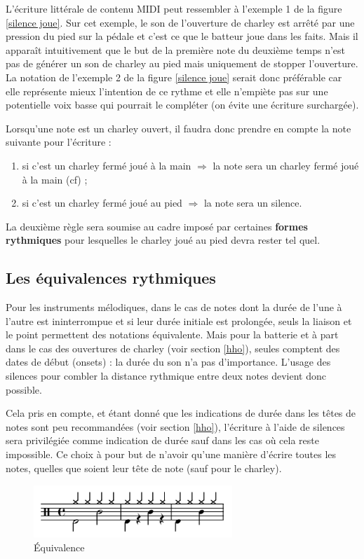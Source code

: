 L’écriture littérale de contenu MIDI peut ressembler à l’exemple 1 de la figure
\ref{silence joue}. Sur cet exemple, le son de l’ouverture de charley est
arrêté par une pression du pied sur la pédale et c’est ce que le batteur joue
dans les faits. Mais il apparaît intuitivement que le but de la première note
du deuxième temps n’est pas de générer un son de charley au pied mais
uniquement de stopper l’ouverture. La notation de l’exemple 2 de la figure
\ref{silence joue} serait donc préférable car elle représente mieux l’intention
de ce rythme et elle n’empiète pas sur une potentielle voix basse qui pourrait
le compléter (on évite une écriture surchargée).

Lorsqu’une note est un charley ouvert, il faudra donc prendre en compte la note
suivante pour l’écriture :
\begin{enumerate}
    \item si c’est un charley fermé joué à la main $\Rightarrow$ la note sera
        un charley fermé joué à la main (cf) ;
    \item si c’est un charley fermé joué au pied $\Rightarrow$ la note sera un
        silence.
\end{enumerate}
La deuxième règle sera soumise au cadre imposé par certaines
\textbf{formes rythmiques} pour lesquelles le charley joué au pied devra rester
tel quel. 

\subsection*{Les équivalences rythmiques}
Pour les instruments mélodiques, dans le cas de notes dont la durée de l’une à
l’autre est ininterrompue et si leur durée initiale est prolongée, seuls la
liaison et le point permettent des notations équivalente. Mais pour la
batterie et à part dans le cas des ouvertures de charley (voir section
\ref{hho}), seules comptent des dates de début (onsets) : la durée du son n’a
pas d’importance. L’usage des silences pour combler la distance rythmique entre
deux notes devient donc possible.

Cela pris en compte, et étant donné que les indications de durée dans les têtes
de notes sont peu recommandées (voir section \ref{hho}), l’écriture à l’aide de
silences sera privilégiée comme indication de durée sauf dans les cas où cela
reste impossible. Ce choix à pour but de n’avoir qu’une manière d’écrire toutes
les notes, quelles que soient leur tête de note (sauf pour le charley).

\begin{figure}[h]
	\centering
	\includegraphics[height=20mm, width=75mm]{
    z_images/3_methodes/0_notation_de_la_batterie/6_equivalence.png}
	\caption{Équivalence}
	\label{equivalence}
\end{figure}

